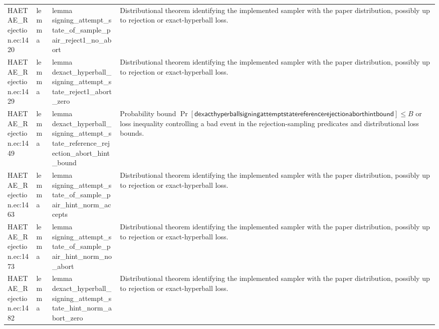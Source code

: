 \documentclass[10pt]{article}
\begin{document}
\begin{longtable}{L{0.11\textwidth}L{0.055\textwidth}L{0.385\textwidth}L{0.41\textwidth}}
HAETAE\_\allowbreak{}Rejection.\allowbreak{}ec:\allowbreak{}1420 & lemma & {\ttfamily\scriptsize lemma signing\_\allowbreak{}attempt\_\allowbreak{}state\_\allowbreak{}of\_\allowbreak{}sample\_\allowbreak{}pair\_\allowbreak{}reject1\_\allowbreak{}no\_\allowbreak{}abort} & Distributional theorem identifying the implemented sampler with the paper distribution, possibly up to rejection or exact-hyperball loss. \\
HAETAE\_\allowbreak{}Rejection.\allowbreak{}ec:\allowbreak{}1429 & lemma & {\ttfamily\scriptsize lemma dexact\_\allowbreak{}hyperball\_\allowbreak{}signing\_\allowbreak{}attempt\_\allowbreak{}state\_\allowbreak{}reject1\_\allowbreak{}abort\_\allowbreak{}zero} & Distributional theorem identifying the implemented sampler with the paper distribution, possibly up to rejection or exact-hyperball loss. \\
HAETAE\_\allowbreak{}Rejection.\allowbreak{}ec:\allowbreak{}1449 & lemma & {\ttfamily\scriptsize lemma dexact\_\allowbreak{}hyperball\_\allowbreak{}signing\_\allowbreak{}attempt\_\allowbreak{}state\_\allowbreak{}reference\_\allowbreak{}rejection\_\allowbreak{}abort\_\allowbreak{}hint\_\allowbreak{}bound} & Probability bound $\Pr[\mathsf{dexacthyperballsigningattemptstatereferencerejectionaborthintbound}]\le B$ or loss inequality controlling a bad event in the rejection-sampling predicates and distributional loss bounds. \\
HAETAE\_\allowbreak{}Rejection.\allowbreak{}ec:\allowbreak{}1463 & lemma & {\ttfamily\scriptsize lemma signing\_\allowbreak{}attempt\_\allowbreak{}state\_\allowbreak{}of\_\allowbreak{}sample\_\allowbreak{}pair\_\allowbreak{}hint\_\allowbreak{}norm\_\allowbreak{}accepts} & Distributional theorem identifying the implemented sampler with the paper distribution, possibly up to rejection or exact-hyperball loss. \\
HAETAE\_\allowbreak{}Rejection.\allowbreak{}ec:\allowbreak{}1473 & lemma & {\ttfamily\scriptsize lemma signing\_\allowbreak{}attempt\_\allowbreak{}state\_\allowbreak{}of\_\allowbreak{}sample\_\allowbreak{}pair\_\allowbreak{}hint\_\allowbreak{}norm\_\allowbreak{}no\_\allowbreak{}abort} & Distributional theorem identifying the implemented sampler with the paper distribution, possibly up to rejection or exact-hyperball loss. \\
HAETAE\_\allowbreak{}Rejection.\allowbreak{}ec:\allowbreak{}1482 & lemma & {\ttfamily\scriptsize lemma dexact\_\allowbreak{}hyperball\_\allowbreak{}signing\_\allowbreak{}attempt\_\allowbreak{}state\_\allowbreak{}hint\_\allowbreak{}norm\_\allowbreak{}abort\_\allowbreak{}zero} & Distributional theorem identifying the implemented sampler with the paper distribution, possibly up to rejection or exact-hyperball loss. \\

\end{longtable}
\end{document}
